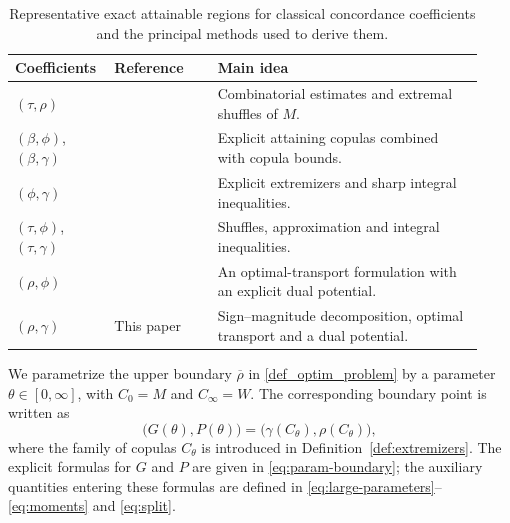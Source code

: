 \documentclass{article}
\theoremstyle{definition}
\theoremstyle{remark}
\newcommand{\1}{\mathds{1}}
\begin{document}
\begin{table}[t]
\centering
\small
\caption{Representative exact attainable regions for classical concordance
coefficients and the principal methods used to derive them.}
\label{tab:literature}
\begin{tabular}{@{}p{0.18\linewidth}p{0.21\linewidth}p{0.54\linewidth}@{}}
\toprule
Coefficients & Reference & Main idea\\
\midrule
$(\tau,\rho)$
& \citep{schreyer2017exact}
& Combinatorial estimates and extremal shuffles of $M$.\\[2mm]

$(\beta,\phi)$, $(\beta,\gamma)$
& \citep{bukovsek2021spearman}
& Explicit attaining copulas combined with copula bounds.\\[2mm]

$(\phi,\gamma)$
& \citep{bukovsek2022exact}
& Explicit extremizers and sharp integral inequalities.\\[2mm]

$(\tau,\phi)$, $(\tau,\gamma)$
& \citep{bukovsek2023exact}
& Shuffles, approximation and integral inequalities.\\[2mm]

$(\rho,\phi)$
& \citep{ansari2026exact}
& An optimal-transport formulation with an explicit dual potential.\\[2mm]

$(\rho,\gamma)$
& This paper
& Sign--magnitude decomposition, optimal transport and a dual potential.\\
\bottomrule
\end{tabular}
\end{table}



We parametrize the upper boundary \(\overline{\rho}\) in \eqref{def_optim_problem} by a parameter $\theta\in[0,\infty]$,
with $C_0=M$ and $C_\infty=W$. The corresponding boundary point is written
as
$$
    \bigl(G(\theta),P(\theta)\bigr)
    =
    \bigl(\gamma(C_\theta),\rho(C_\theta)\bigr),
$$
where the family of copulas $C_\theta$ is introduced in
Definition~\ref{def:extremizers}. The explicit formulas for $G$ and $P$ are
given in \eqref{eq:param-boundary}; the auxiliary quantities entering these
formulas are defined in
\eqref{eq:large-parameters}--\eqref{eq:moments} and \eqref{eq:split}.
\end{document}
